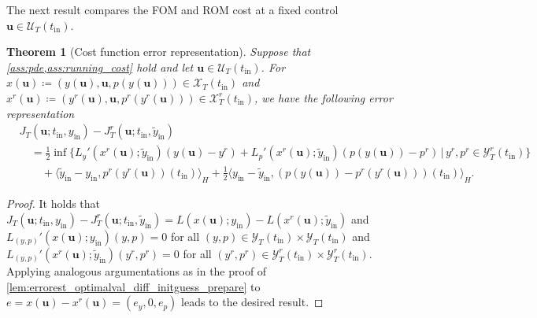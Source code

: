 \documentclass{m2an}
\newcommand{\bu}{\mathbf{u}}
\newcommand{\tint}{t_{\mathrm{in}}}
\newcommand{\yint}{y_{\mathrm{in}}}
\newcommand{\tildeyint}{\tilde y_{\mathrm{in}}}
\newcommand{\mU}{{\mathscr U}}
\newcommand{\mX}{{\mathscr X}}
\newcommand{\mY}{{\mathscr Y}}
\newtheorem{theorem}[thrm]{Theorem}
\begin{document}
%
The next result compares the FOM and ROM cost at a fixed control $\bu\in\mU_T(\tint)$.
%
\begin{theorem}[Cost function error representation]
    \label{lem:errorest_optimalval_not_optimal}
    Suppose that \cref{ass:pde,ass:running_cost} hold and let $\bu\in\mU_T(\tint)$. For $x(\bu)\coloneqq(y(\bu),\bu,p(y(\bu)))\in\mX_T(\tint)$ and $x^r(\bu)\coloneqq(y^r(\bu),\bu,p^r(y^r(\bu)))\in\mX^r_T(\tint)$, we have the following error representation
    \begin{align}\nonumber
        &J_T(\bu ;\tint,\yint)- J^r_T(\bu;\tint,\tildeyint)\\
        &\label{eq:infCostest}\quad=\tfrac{1}{2}\inf\big\{L_y'(x^r(\bu);\tildeyint)(y(\bu)-y^r)+L_p'(x^r(\bu);\tildeyint)(p(y(\bu))-p^r)\,\big|\,y^r,p^r\in \mY^r_T(\tint)\big\}\\
        &\qquad+ {\langle {\tildeyint}-\yint, p^r(y^r(\bu))(\tint)\rangle}_H + \tfrac{1}{2} {\langle \yint-{ \tildeyint}, (p(y(\bu))-p^r(y^r(\bu)))(\tint)\rangle}_H.\nonumber
    \end{align}
\end{theorem}

\begin{proof}
    It holds that $
    J_T(\bu ;\tint,\yint)- J^r_T(\bu;\tint,\tildeyint) = L(x(\bu);\yint)-L(x^r(\bu) ;\tildeyint)$ 
    and $L_{(y,p)}'(x(\bu);\yint)(y,p)=0$ for all $(y,p)\in \mY_T(\tint)\times\mY_T(\tint)$ and $L_{(y,p)}'(x^r(\bu);\tildeyint)(y^r,p^r)=0$ for all $(y^r,p^r)\in\mY_T^r(\tint)\times\mY_T^r(\tint)$. 
    Applying analogous argumentations as in the proof of \cref{lem:errorest_optimalval_diff_initguess_prepare} to $e=x(\bu)-x^r(\bu)= (e_y,0,e_p)$ leads to the desired result.
\end{proof}
\end{document}
